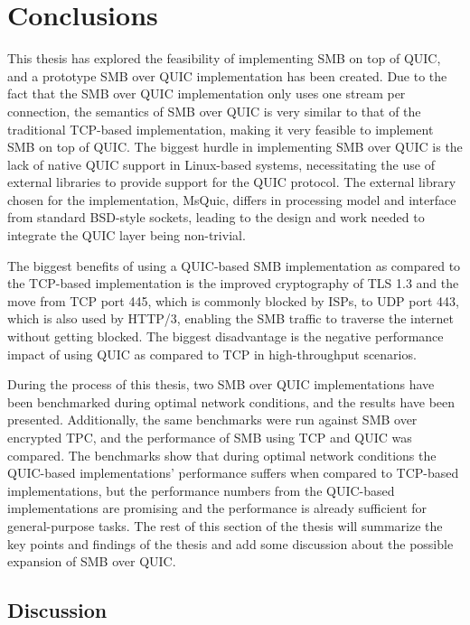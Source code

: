 \documentclass[english, 12pt, a4paper, elec, utf8, a-2b, online]{aaltothesis}
\begin{document}
\clearpage
\section{Conclusions}
\label{sec:conclusion}
\label{sec:summary}

This thesis has explored the feasibility of implementing SMB on top of QUIC,
and a prototype SMB over QUIC implementation has been created. Due to the fact that the
SMB over QUIC implementation only uses one stream per connection, the semantics of
SMB over QUIC is very similar to that of the traditional TCP-based implementation,
making it very feasible to implement SMB on top of QUIC.
The biggest hurdle in implementing SMB over QUIC is the lack of native QUIC support in Linux-based
systems, necessitating the use of external libraries to provide support for the QUIC protocol.
The external library chosen for the implementation, MsQuic, differs in processing model
and interface from standard BSD-style sockets, leading to the design and work needed to integrate
the QUIC layer being non-trivial.

The biggest benefits of using a QUIC-based SMB implementation as compared to the TCP-based implementation
is the improved cryptography of TLS 1.3 and the move from TCP port 445, which is commonly
blocked by ISPs, to UDP port 443, which is also used by HTTP/3, enabling the SMB
traffic to traverse the internet without getting blocked. The biggest disadvantage is
the negative performance impact of using QUIC as compared to TCP in high-throughput
scenarios.

During the process of this thesis, two SMB over QUIC implementations have been benchmarked
during optimal network conditions, and the results have been presented. Additionally,
the same benchmarks were run against SMB over encrypted TPC, and the performance of SMB
using TCP and QUIC was compared. The benchmarks show that during optimal network conditions
the QUIC-based implementations' performance suffers when compared to TCP-based implementations,
but the performance numbers from the QUIC-based implementations are promising and
the performance is already sufficient for general-purpose tasks. The rest of this section of the
thesis will summarize the key points and findings of the thesis
and add some discussion about the possible expansion of SMB over QUIC.

\subsection{Discussion}
\end{document}
